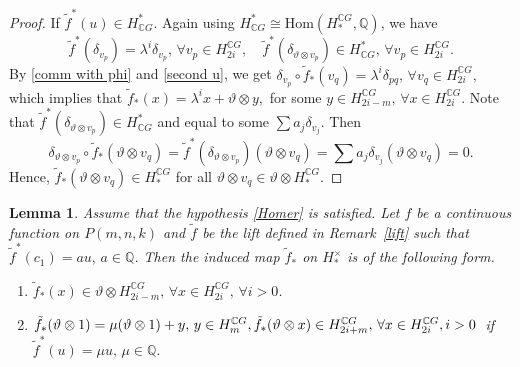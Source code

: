 \documentclass{amsart}
\newtheorem{lemma}[theorem]{Lemma}
\newcommand{\remref}[1]{Remark~\ref{#1}}
\renewcommand{\hom}{\mathrm{Hom}}
\begin{document}
\begin{proof}
		If $\tilde{f}^*(u)\in H^*_{\mathbb{C}G}$. Again using $H^*_{\mathbb{C}G}\cong \hom(H_*^{\mathbb{C}G},\mathbb{Q})$, we have \begin{equation}\label{second u}
			\tilde{f}^*(\delta_{v_p}) = \lambda^i \delta_{v_{p}}, \, \forall v_{p}\in H_{2i}^{\mathbb{C}G}, \quad \tilde{f}^*(\delta_{\vartheta\otimes v_{p}})  \in H^*_{\mathbb{C}G},\, \forall  v_{p}\in H_{2i}^{\mathbb{C}G}.
		\end{equation}
		By \eqref{comm with phi} and \eqref{second u}, we get $\delta_{v_p}\circ \tilde{f}_*(v_q) = \lambda^i \delta_{pq},\, \forall v_q \in H_{2i}^{\mathbb{C}G},$ which implies that $\tilde{f}_*(x) = \lambda^i x + \vartheta\otimes y,$ for some $y \in H_{2i-m}^{\mathbb{C}G}, \, \forall x \in H_{2i}^{\mathbb{C}G}.$ Note that $\tilde f^*(\delta_{\vartheta\otimes v_p})\in H_{\mathbb CG}^*$ and equal to some $\sum a_j\delta_{v_j}$. Then 
		\begin{equation}\label{computation}
			\delta_{\vartheta\otimes v_p}\circ \tilde f_*(\vartheta\otimes v_q)= \tilde f^*(\delta_{\vartheta\otimes v_p})(\vartheta\otimes v_q)=\sum a_j\delta_{v_j}(\vartheta\otimes v_q)=0.
		\end{equation}
		Hence, $\tilde f_*(\vartheta \otimes v_q)\in H_*^{\mathbb CG}$ for all $\vartheta \otimes v_q\in\vartheta\otimes H_*^{\mathbb CG} $.
	\end{proof}
	\begin{lemma}\label{image of homf under hom}
		Assume that the hypothesis \eqref{Homer} is satisfied. 	Let $f$ be a continuous function on $P(m,n,k)$ and $\tilde{f}$ be the lift defined in \remref{lift} such that $\tilde{f}^*(c_1)= au,\, a\in \mathbb{Q}$. Then the induced map $\tilde{f}_*$ on $H_{*}^{\times}$ is of the following %
form.
		\begin{enumerate}
			\item $\tilde f_* (x)\in \vartheta\otimes H_{2i-m}^{\mathbb CG},\, \forall x\in H_{2i}^{\mathbb CG},\, \forall i>0$.
			\item $\tilde{f}_*(\vartheta\otimes 1) = \mu (\vartheta\otimes 1 )+y, \, y\in H_{m}^{\mathbb{C}G}, \quad\\ \tilde f_*(\vartheta \otimes x)\in H_{2i+m}^{\mathbb{C}G},\, \forall x \in H_{2i}^{\mathbb{C}G}, i>0\;$ if $\tilde{f}^*(u) = \mu u,\,  \mu \in \mathbb{Q.}$ 
		\end{enumerate}
	\end{lemma}
\end{document}

